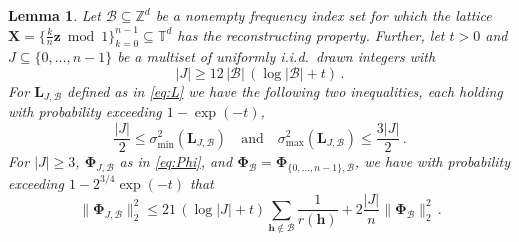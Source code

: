 \documentclass[a4paper]{amsart}
\newtheorem{lemma}[theorem]{Lemma}
\newcommand{\modone}{\bmod{}1}
\begin{document}
\begin{lemma}\label{constructions} Let $\mathcal B\subseteq\mathds Z^d$ be a nonempty frequency index set for which the lattice $\bm X = \{\frac kn\bm z\modone\}_{k=0}^{n-1} \subseteq\mathds T^d$ has the reconstructing property.
    Further, let $t>0$ and $J\subseteq\{0, \dots, n-1\}$ be a multiset of uniformly i.i.d.\ drawn integers with
    \begin{equation}\label{eq:12}
        |J| \ge 12 \, |\mathcal B| \, (\log|\mathcal B| + t) \,.
    \end{equation}
    For $\bm L_{J,\mathcal B}$ defined as in \eqref{eq:L} we have the following two inequalities, each holding with probability exceeding $1-\exp(-t)$,
    \begin{equation}\label{eq:sepultura}
        \frac{|J|}{2} \le \sigma_{\min}^2(\bm L_{J,\mathcal B})
        \quad\text{and}\quad
        \sigma_{\max}^2(\bm L_{J,\mathcal B}) \le \frac{3|J|}{2} \,.
    \end{equation}
    For $|J|\ge 3$, $\bm\Phi_{J,\mathcal B}$ as in \eqref{eq:Phi}, and $\bm\Phi_{\mathcal B} = \bm\Phi_{\{0,\dots,n-1\},\mathcal B}$, we have with probability exceeding $1-2^{3/4}\exp(-t)$ that
    \begin{equation}\label{eq:watain}
        \|\bm\Phi_{J,\mathcal B}\|_{2}^2
        \le 21 \, (\log|J|+t) \sum_{\bm h\notin\mathcal B} \frac{1}{r(\bm h)} + 2\frac{|J|}{n} \|\bm\Phi_{\mathcal B}\|_{2}^2 \,.
    \end{equation}
\end{lemma} 
\end{document}
